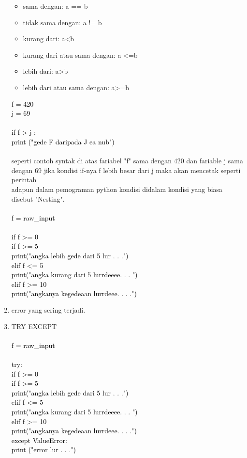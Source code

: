 \documentclass[12pt]{article}
\begin{document}
\begin{enumerate}
					\begin{itemize}
						\item sama dengan: a == b
						\item tidak sama dengan: a != b
						\item kurang dari: a<b
						\item kurang dari atau sama dengan: a <=b
						\item lebih dari: a>b
						\item lebih dari atau sama dengan: a>=b
					\end{itemize}
					\textcolor{black}{
					f = 420\\
					j = 69	\\				
					\\
					if f > j :\\
						print ("gede F daripada J ea nub")\\
						\\
					}
				seperti contoh syntak di atas fariabel "f" sama dengan 420 dan fariable j sama dengan 69 jika kondisi if-nya f lebih besar dari j maka akan mencetak seperti perintah
				\\				
				adapun dalam pemograman python kondisi didalam kondisi yang biasa disebut "Nesting". \\\\
				\textcolor{black}{
					f = raw\_input\\
					\\
					if f >= 0\\
						if f >= 5\\
							print("angka lebih gede dari 5 lur . . .")\\
						elif f <= 5\\
							print("angka kurang dari 5 lurrdeeee. . . ")\\
					elif f >= 10\\
						print("angkanya kegedeaan lurrdeee. . . .")\\
					}
					
			\item error yang sering terjadi.
					
			\item TRY EXCEPT\\\\
				\textcolor{black}{
					f = raw\_input\\
					\\
					try:\\
					if f >= 0\\
						if f >= 5\\
							print("angka lebih gede dari 5 lur . . .")\\
						elif f <= 5\\
							print("angka kurang dari 5 lurrdeeee. . . ")\\
					elif f >= 10\\
						print("angkanya kegedeaan lurrdeee. . . .")\\
					except ValueError:\\
					print ("error lur . . .")\\
					}
					

\end{enumerate}
\end{document}
